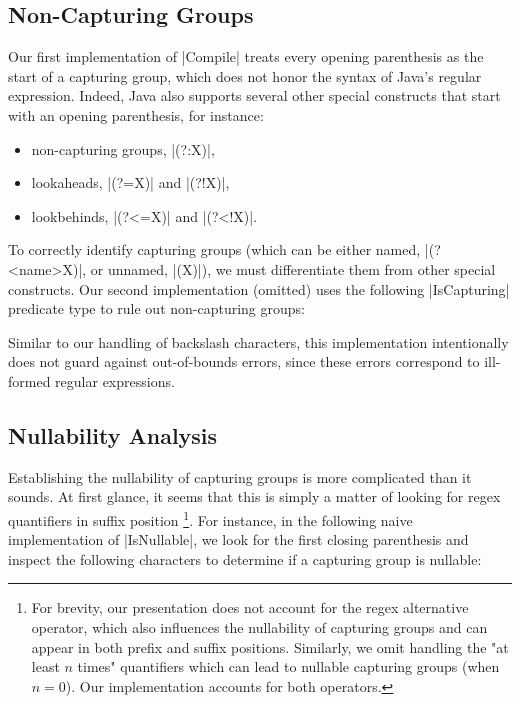 \subsection{Non-Capturing Groups}
\label{subsec:non-capturing-groups}

Our first implementation of |Compile| treats every opening parenthesis as the start of a capturing group, which does not honor the syntax of Java's regular expression.
Indeed, Java also supports several other special constructs that start with an opening parenthesis, for instance:

\begin{itemize}
  \item non-capturing groups, |(?:X)|,
  \item lookaheads, |(?=X)| and |(?!X)|,
  \item lookbehinds, |(?<=X)| and |(?<!X)|.
\end{itemize}

\noindent
To correctly identify capturing groups (which can be either named, |(?<name>X)|, or unnamed, |(X)|), we must differentiate them from other special constructs.
Our second implementation (omitted) uses the following |IsCapturing| predicate type to rule out non-capturing groups:

\regexIsCapturing

\noindent
Similar to our handling of backslash characters, this implementation intentionally does not guard against out-of-bounds errors, since these errors correspond to ill-formed regular expressions.

\subsection{Nullability Analysis}

Establishing the nullability of capturing groups is more complicated than it sounds.
At first glance, it seems that this is simply a matter of looking for regex quantifiers in suffix position%
\footnote{
For brevity, our presentation does not account for the regex alternative operator, which also influences the nullability of capturing groups and can appear in both prefix and suffix positions.
Similarly, we omit handling the "at least $n$ times" quantifiers which can lead to nullable capturing groups (when $n=0$).
Our implementation accounts for both operators.
}.
For instance, in the following naive implementation of |IsNullable|, we look for the first closing parenthesis and inspect the following characters to determine if a capturing group is nullable:

